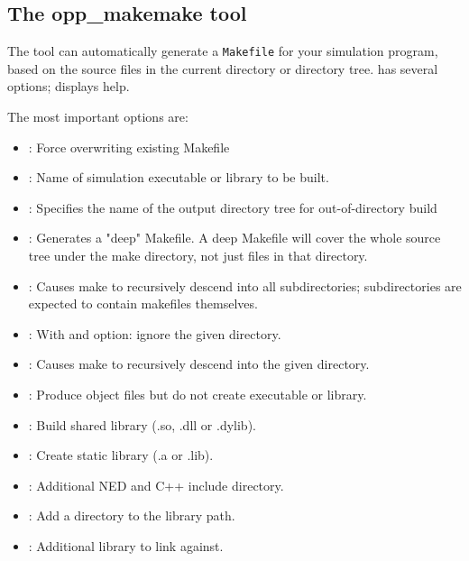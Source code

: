 \subsection{The opp\_makemake tool}

The  tool can automatically generate a
\texttt{Makefile} for your simulation program, based on the source files
in the current directory or directory tree.
 has several options; 
displays help.

The most important options are:

\begin{itemize}
    \item{ : Force overwriting existing Makefile}
    \item{ : Name of simulation executable or library to be built.}
    \item{ : Specifies the name of the output directory tree
                          for out-of-directory build}
    \item{ : Generates a "deep" Makefile. A deep Makefile will
                          cover the whole source tree under the make directory,
                          not just files in that directory.}
    \item{ : Causes make to recursively descend into all subdirectories; 
                          subdirectories are expected to contain
                          makefiles themselves.}
    \item{ :
                          With  and  option: ignore the given directory.}
    \item{ :
                          Causes make to recursively descend into the given
                          directory.}
    \item{ :  Produce object files but do not create executable or
                          library.}
    \item{ : Build shared library (.so, .dll or .dylib).}
    \item{ : Create static library (.a or .lib).}
    \item{ :         Additional NED and C++ include directory.}
    \item{ :         Add a directory to the library path.}
    \item{ :     Additional library to link against.}
\end{itemize}


